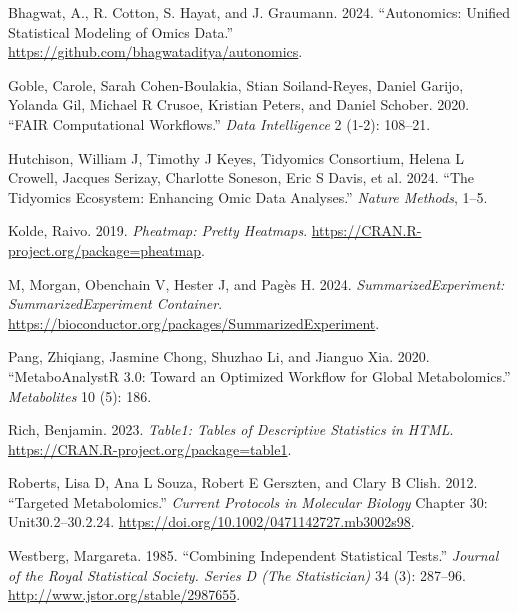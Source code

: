 \hypertarget{refs}{}
\begin{CSLReferences}{1}{0}
\leavevmode{}%
Bhagwat, A., R. Cotton, S. Hayat, and J. Graumann. 2024. {``Autonomics: Unified Statistical Modeling of Omics Data.''} \url{https://github.com/bhagwataditya/autonomics}.

\leavevmode{}%
Goble, Carole, Sarah Cohen-Boulakia, Stian Soiland-Reyes, Daniel Garijo, Yolanda Gil, Michael R Crusoe, Kristian Peters, and Daniel Schober. 2020. {``FAIR Computational Workflows.''} \emph{Data Intelligence} 2 (1-2): 108--21.

\leavevmode{}%
Hutchison, William J, Timothy J Keyes, Tidyomics Consortium, Helena L Crowell, Jacques Serizay, Charlotte Soneson, Eric S Davis, et al. 2024. {``The Tidyomics Ecosystem: Enhancing Omic Data Analyses.''} \emph{Nature Methods}, 1--5.

\leavevmode{}%
Kolde, Raivo. 2019. \emph{Pheatmap: Pretty Heatmaps}. \url{https://CRAN.R-project.org/package=pheatmap}.

\leavevmode{}%
M, Morgan, Obenchain V, Hester J, and Pagès H. 2024. \emph{SummarizedExperiment: SummarizedExperiment Container}. \url{https://bioconductor.org/packages/SummarizedExperiment}.

\leavevmode{}%
Pang, Zhiqiang, Jasmine Chong, Shuzhao Li, and Jianguo Xia. 2020. {``MetaboAnalystR 3.0: Toward an Optimized Workflow for Global Metabolomics.''} \emph{Metabolites} 10 (5): 186.

\leavevmode{}%
Rich, Benjamin. 2023. \emph{Table1: Tables of Descriptive Statistics in HTML}. \url{https://CRAN.R-project.org/package=table1}.

\leavevmode{}%
Roberts, Lisa D, Ana L Souza, Robert E Gerszten, and Clary B Clish. 2012. {``Targeted Metabolomics.''} \emph{Current Protocols in Molecular Biology} Chapter 30: Unit30.2--30.2.24. \url{https://doi.org/10.1002/0471142727.mb3002s98}.

\leavevmode{}%
Westberg, Margareta. 1985. {``Combining Independent Statistical Tests.''} \emph{Journal of the Royal Statistical Society. Series D (The Statistician)} 34 (3): 287--96. \url{http://www.jstor.org/stable/2987655}.

\end{CSLReferences}


